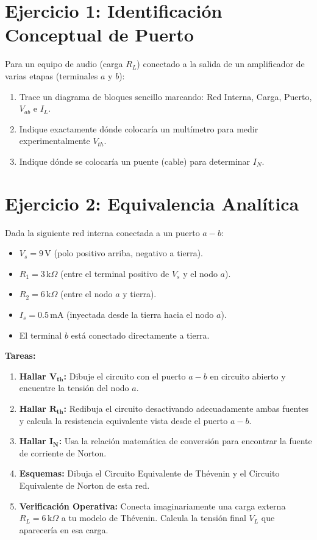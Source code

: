 \documentclass[11pt, a4paper]{article}
\begin{document}
\begin{tcolorbox}[colback=ucbblue!5!white, colframe=ucbblue, title=\textbf{Práctica Independiente: Conceptos y Teoremas Terminales}]
\end{tcolorbox}

\section*{Ejercicio 1: Identificación Conceptual de Puerto}
Para un equipo de audio (carga $R_L$) conectado a la salida de un amplificador de varias etapas (terminales $a$ y $b$):
\begin{enumerate}
    \item Trace un diagrama de bloques sencillo marcando: Red Interna, Carga, Puerto, $V_{ab}$ e $I_L$.
    \item Indique exactamente dónde colocaría un multímetro para medir experimentalmente $V_{th}$.
    \item Indique dónde se colocaría un puente (cable) para determinar $I_N$.
\end{enumerate}

\vspace{0.5cm}

\section*{Ejercicio 2: Equivalencia Analítica}
Dada la siguiente red interna conectada a un puerto $a-b$:
\begin{itemize}
    \item $V_s = 9\,\text{V}$ (polo positivo arriba, negativo a tierra).
    \item $R_1 = 3\,\text{k}\Omega$ (entre el terminal positivo de $V_s$ y el nodo $a$).
    \item $R_2 = 6\,\text{k}\Omega$ (entre el nodo $a$ y tierra).
    \item $I_s = 0.5\,\text{mA}$ (inyectada desde la tierra hacia el nodo $a$).
    \item El terminal $b$ está conectado directamente a tierra.
\end{itemize}

\textbf{Tareas:}
\begin{enumerate}
    \item \textbf{Hallar $\bm{V_{th}}$:} Dibuje el circuito con el puerto $a-b$ en circuito abierto y encuentre la tensión del nodo $a$.
    \item \textbf{Hallar $\bm{R_{th}}$:} Redibuja el circuito desactivando adecuadamente ambas fuentes y calcula la resistencia equivalente vista desde el puerto $a-b$.
    \item \textbf{Hallar $\bm{I_N}$:} Usa la relación matemática de conversión para encontrar la fuente de corriente de Norton.
    \item \textbf{Esquemas:} Dibuja el Circuito Equivalente de Thévenin y el Circuito Equivalente de Norton de esta red.
    \item \textbf{Verificación Operativa:} Conecta imaginariamente una carga externa $R_L = 6\,\text{k}\Omega$ a tu modelo de Thévenin. Calcula la tensión final $V_L$ que aparecería en esa carga.
\end{enumerate}
\end{document}
